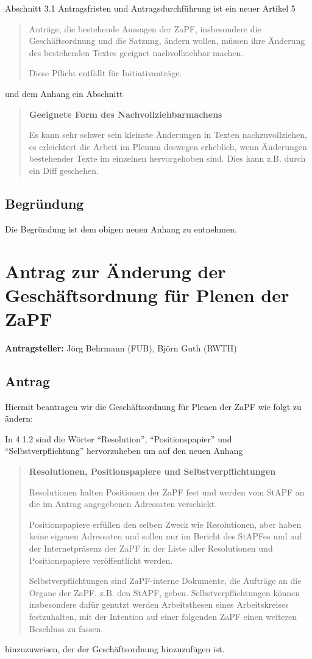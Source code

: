 \documentclass[draft,10pt,oneside]{scrartcl}
\begin{document}
Abschnitt 3.1 Antragsfristen und Antragsdurchführung ist ein neuer Artikel 5
\begin{quote}
  Anträge, die bestehende Aussagen der ZaPF, insbesondere die Geschäftsordnung
  und die Satzung, ändern wollen, müssen ihre Änderung des bestehenden Textes
  geeignet nachvollziehbar machen.

  Diese Pflicht entfällt für Initiativanträge.
\end{quote}
und dem Anhang ein Abschnitt
\begin{quote}
  \textbf{Geeignete Form des Nachvollziehbarmachens}

  Es kann sehr schwer sein kleinste Änderungen in Texten nachzuvollziehen, es
  erleichtert die Arbeit im Plenum deswegen erheblich, wenn Änderungen
  bestehender Texte im einzelnen hervorgehoben sind. Dies kann z.B. durch ein
  Diff geschehen.
\end{quote}

\subsection*{Begründung}

Die Begründung ist dem obigen neuen Anhang zu entnehmen.

\newpage

\section*{Antrag zur Änderung der Geschäftsordnung für Plenen der ZaPF}

\textbf{Antragsteller:} Jörg Behrmann (FUB), Björn Guth (RWTH)

\subsection*{Antrag}

Hiermit beantragen wir die Geschäftsordnung für Plenen der ZaPF wie folgt zu
ändern:

In 4.1.2 sind die Wörter ``Resolution'', ``Positionspapier'' und
``Selbstverpflichtung'' hervorzuheben um auf den neuen Anhang
\begin{quote}
  \textbf{Resolutionen, Positionspapiere und Selbstverpflichtungen}

  Resolutionen halten Positionen der ZaPF fest und werden vom StAPF an die im
  Antrag angegebenen Adressaten verschickt.

  Positionspapiere erfüllen den selben Zweck wie Resolutionen, aber haben keine
  eigenen Adressaten und sollen nur im Bericht des StAPFes und auf der
  Internetpräsenz der ZaPF in der Liste aller Resolutionen und Positionspapiere
  veröffentlicht werden.

  Selbstverpflichtungen sind ZaPF-interne Dokumente, die Aufträge an die Organe
  der ZaPF, z.B. den StAPF, geben. Selbstverpflichtungen können insbesondere
  dafür genutzt werden Arbeitsthesen eines Arbeitskreises festzuhalten, mit der
  Intention auf einer folgenden ZaPF einen weiteren Beschluss zu fassen.
\end{quote}
hinzuzuweisen, der der Geschäftsordnung hinzuzufügen ist.
\end{document}
